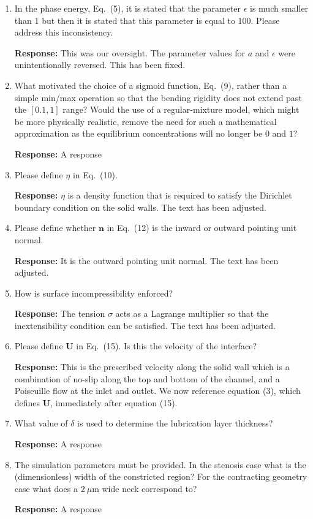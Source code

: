 \documentclass[11pt]{article}
\begin{document}
\begin{enumerate}
\item In the phase energy, Eq.~(5), it is stated that the parameter
  $\epsilon$ is much smaller than 1 but then it is stated that this
    parameter is equal to 100. Please address this inconsistency.

\noindent
{\bf Response:} This was our oversight. The parameter values for $a$ and
$\epsilon$ were unintentionally reversed. This has been fixed.

\item What motivated the choice of a sigmoid function, Eq.~(9), rather
  than a simple min/max operation so that the bending rigidity does not
    extend past the $[0.1, 1]$ range? Would the use of a regular-mixture
    model, which might be more physically realistic, remove the need for
    such a mathematical approximation as the equilibrium concentrations
    will no longer be $0$ and $1$?

\noindent
{\bf Response:} A response

\item Please define $\eta$ in Eq.~(10). 

\noindent
{\bf Response:} $\eta$ is a density function that is required to satisfy
    the Dirichlet boundary condition on the solid walls. The text has
    been adjusted.

\item Please define whether $\mathbf{n}$ in Eq.~(12) is the inward or outward pointing unit normal.

\noindent
{\bf Response:} It is the outward pointing unit normal. The text has
    been adjusted.

\item How is surface incompressibility enforced?

\noindent
{\bf Response:} The tension $\sigma$ acts as a Lagrange multiplier so
    that the inextensibility condition can be satisfied. The text has
    been adjusted.

\item Please define $\mathbf{U}$ in Eq.~(15). Is this the velocity of
  the interface?

{\bf Response:} This is the prescribed velocity along the solid wall
    which is a combination of no-slip along the top and bottom of the
    channel, and a Poiseuille flow at the inlet and outlet. We now
    reference equation (3), which defines $\mathbf{U}$, immediately
    after equation (15). 

\item What value of $\delta$ is used to determine the lubrication layer
  thickness?

{\bf Response:} A response

\item The simulation parameters must be provided. In the stenosis case
  what is the (dimensionless) width of the constricted region? For the
    contracting geometry case what does a $2~\mu$m wide neck correspond
    to?

{\bf Response:} A response

\end{enumerate}
\end{document}
